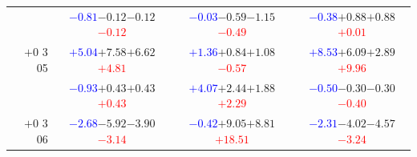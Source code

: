 \documentclass[compress]{beamer}
\begin{document}
\begin{frame}
\begin{tabular}{r | c | c | c}
          & \textcolor{blue}{$-0.81$}\hspace{0.1 cm}$-0.12$\hspace{0.1 cm}$-0.12$\hspace{0.1 cm}\textcolor{red}{$-0.12$} & \textcolor{blue}{$-0.03$}\hspace{0.1 cm}$-0.59$\hspace{0.1 cm}$-1.15$\hspace{0.1 cm}\textcolor{red}{$-0.49$} & \textcolor{blue}{$-0.38$}\hspace{0.1 cm}$+0.88$\hspace{0.1 cm}$+0.88$\hspace{0.1 cm}\textcolor{red}{$+0.01$} \\
$+$0 3 05 & \textcolor{blue}{$+5.04$}\hspace{0.1 cm}$+7.58$\hspace{0.1 cm}$+6.62$\hspace{0.1 cm}\textcolor{red}{$+4.81$} & \textcolor{blue}{$+1.36$}\hspace{0.1 cm}$+0.84$\hspace{0.1 cm}$+1.08$\hspace{0.1 cm}\textcolor{red}{$-0.57$} & \textcolor{blue}{$+8.53$}\hspace{0.1 cm}$+6.09$\hspace{0.1 cm}$+2.89$\hspace{0.1 cm}\textcolor{red}{$+9.96$} \\
          & \textcolor{blue}{$-0.93$}\hspace{0.1 cm}$+0.43$\hspace{0.1 cm}$+0.43$\hspace{0.1 cm}\textcolor{red}{$+0.43$} & \textcolor{blue}{$+4.07$}\hspace{0.1 cm}$+2.44$\hspace{0.1 cm}$+1.88$\hspace{0.1 cm}\textcolor{red}{$+2.29$} & \textcolor{blue}{$-0.50$}\hspace{0.1 cm}$-0.30$\hspace{0.1 cm}$-0.30$\hspace{0.1 cm}\textcolor{red}{$-0.40$} \\
$+$0 3 06 & \textcolor{blue}{$-2.68$}\hspace{0.1 cm}$-5.92$\hspace{0.1 cm}$-3.90$\hspace{0.1 cm}\textcolor{red}{$-3.14$} & \textcolor{blue}{$-0.42$}\hspace{0.1 cm}$+9.05$\hspace{0.1 cm}$+8.81$\hspace{0.1 cm}\textcolor{red}{$+18.51$} & \textcolor{blue}{$-2.31$}\hspace{0.1 cm}$-4.02$\hspace{0.1 cm}$-4.57$\hspace{0.1 cm}\textcolor{red}{$-3.24$} \\

\end{tabular}
\end{frame}
\end{document}
